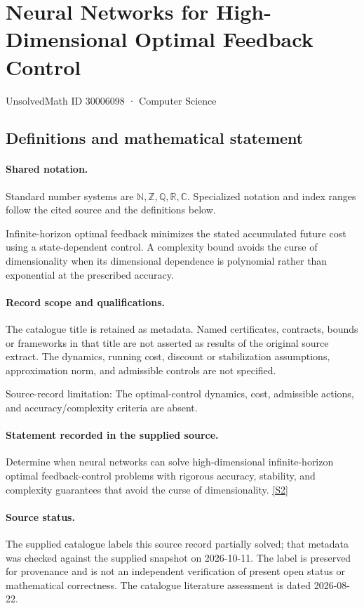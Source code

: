 \documentclass[11pt]{article}
\newcommand{\sref}[2]{\hyperlink{source:#1:#2}{[S#2]}}
\begin{document}
\setcounter{section}{30006097}
\section{Neural Networks for High-Dimensional Optimal Feedback Control}\label{30006098}
{\small\sffamily UnsolvedMath ID 30006098 · Computer Science}
\subsection{Definitions and mathematical statement}

\paragraph{Shared notation.}Standard number systems are $\mathbb N,\mathbb Z,\mathbb Q,\mathbb R,\mathbb C$. Specialized notation and index ranges follow the cited source and the definitions below.


Infinite-horizon optimal feedback minimizes the stated accumulated future cost using a state-dependent control. A complexity bound avoids the curse of dimensionality when its dimensional dependence is polynomial rather than exponential at the prescribed accuracy.
\paragraph{Record scope and qualifications.}
The catalogue title is retained as metadata. Named certificates, contracts, bounds or frameworks in that title are not asserted as results of the original source extract.
The dynamics, running cost, discount or stabilization assumptions, approximation norm, and admissible controls are not specified.

Source-record limitation: The optimal-control dynamics, cost, admissible actions, and accuracy/complexity criteria are absent.
\paragraph{Statement recorded in the supplied source.}
Determine when neural networks can solve high-dimensional infinite-horizon optimal feedback-control problems with rigorous accuracy, stability, and complexity guarantees that avoid the curse of dimensionality. \sref{30006098}{2}
\paragraph{Source status.}
The supplied catalogue labels this source record partially solved; that metadata was checked against the supplied snapshot on 2026-10-11. The label is preserved for provenance and is not an independent verification of present open status or mathematical correctness. The catalogue literature assessment is dated 2026-08-22.
\end{document}
